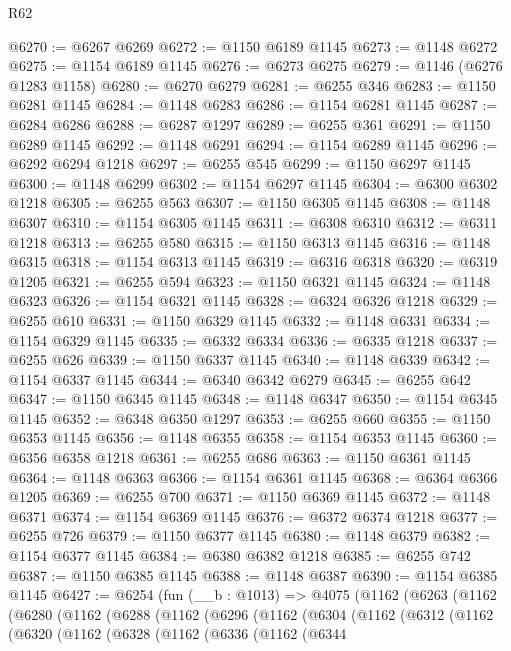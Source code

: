 \begin{lexlean}{R62}
\begin{coremodule}
@6270 := @6267 @6269
@6272 := @1150 @6189 @1145
@6273 := @1148 @6272
@6275 := @1154 @6189 @1145
@6276 := @6273 @6275
@6279 := @1146 (@6276 @1283 @1158)
@6280 := @6270 @6279
@6281 := @6255 @346
@6283 := @1150 @6281 @1145
@6284 := @1148 @6283
@6286 := @1154 @6281 @1145
@6287 := @6284 @6286
@6288 := @6287 @1297
@6289 := @6255 @361
@6291 := @1150 @6289 @1145
@6292 := @1148 @6291
@6294 := @1154 @6289 @1145
@6296 := @6292 @6294 @1218
@6297 := @6255 @545
@6299 := @1150 @6297 @1145
@6300 := @1148 @6299
@6302 := @1154 @6297 @1145
@6304 := @6300 @6302 @1218
@6305 := @6255 @563
@6307 := @1150 @6305 @1145
@6308 := @1148 @6307
@6310 := @1154 @6305 @1145
@6311 := @6308 @6310
@6312 := @6311 @1218
@6313 := @6255 @580
@6315 := @1150 @6313 @1145
@6316 := @1148 @6315
@6318 := @1154 @6313 @1145
@6319 := @6316 @6318
@6320 := @6319 @1205
@6321 := @6255 @594
@6323 := @1150 @6321 @1145
@6324 := @1148 @6323
@6326 := @1154 @6321 @1145
@6328 := @6324 @6326 @1218
@6329 := @6255 @610
@6331 := @1150 @6329 @1145
@6332 := @1148 @6331
@6334 := @1154 @6329 @1145
@6335 := @6332 @6334
@6336 := @6335 @1218
@6337 := @6255 @626
@6339 := @1150 @6337 @1145
@6340 := @1148 @6339
@6342 := @1154 @6337 @1145
@6344 := @6340 @6342 @6279
@6345 := @6255 @642
@6347 := @1150 @6345 @1145
@6348 := @1148 @6347
@6350 := @1154 @6345 @1145
@6352 := @6348 @6350 @1297
@6353 := @6255 @660
@6355 := @1150 @6353 @1145
@6356 := @1148 @6355
@6358 := @1154 @6353 @1145
@6360 := @6356 @6358 @1218
@6361 := @6255 @686
@6363 := @1150 @6361 @1145
@6364 := @1148 @6363
@6366 := @1154 @6361 @1145
@6368 := @6364 @6366 @1205
@6369 := @6255 @700
@6371 := @1150 @6369 @1145
@6372 := @1148 @6371
@6374 := @1154 @6369 @1145
@6376 := @6372 @6374 @1218
@6377 := @6255 @726
@6379 := @1150 @6377 @1145
@6380 := @1148 @6379
@6382 := @1154 @6377 @1145
@6384 := @6380 @6382 @1218
@6385 := @6255 @742
@6387 := @1150 @6385 @1145
@6388 := @1148 @6387
@6390 := @1154 @6385 @1145
@6427 := @6254
    (fun (__b : @1013) =>
    @4075
      (@1162
        (@6263
          (@1162
            (@6280
              (@1162
                (@6288
                  (@1162
                    (@6296
                      (@1162
                        (@6304
                          (@1162
                            (@6312
                              (@1162
                                (@6320
                                  (@1162
                                    (@6328
                                      (@1162
                                        (@6336
                                          (@1162
                                            (@6344

\end{coremodule}
\end{lexlean}
